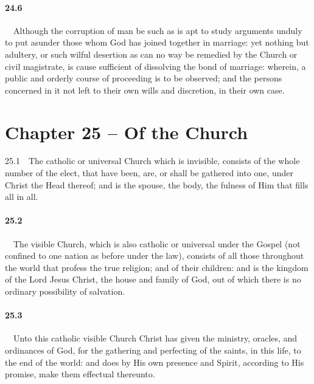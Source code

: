 \paragraph{24.6}\ \ Although the corruption of man be such as is apt to study arguments unduly to put asunder those whom God has joined together in marriage: yet nothing but adultery, or such wilful desertion as can no way be remedied by the Church or civil magistrate, is cause sufficient of dissolving the bond of marriage: wherein, a public and orderly course of proceeding is to be observed; and the persons concerned in it not left to their own wills and discretion, in their own case.  

\section{Chapter 25 -- Of the Church} 25.1\ \ The catholic or universal Church which is invisible, consists of the whole number of the elect, that have been, are, or shall be gathered into one, under Christ the Head thereof; and is the spouse, the body, the fulness of Him that fills all in all.   
\bigskip
\paragraph{25.2}\ \ The visible Church, which is also catholic or universal under the Gospel (not confined to one nation as before under the law), consists of all those throughout the world that profess the true religion; and of their children: and is the kingdom of the Lord Jesus Christ, the house and family of God, out of which there is no ordinary possibility of salvation.   
\bigskip
\paragraph{25.3}\ \ Unto this catholic visible Church Christ has given the ministry, oracles, and ordinances of God, for the gathering and perfecting of the saints, in this life, to the end of the world: and does by His own presence and Spirit, according to His promise, make them effectual thereunto.   
\bigskip
